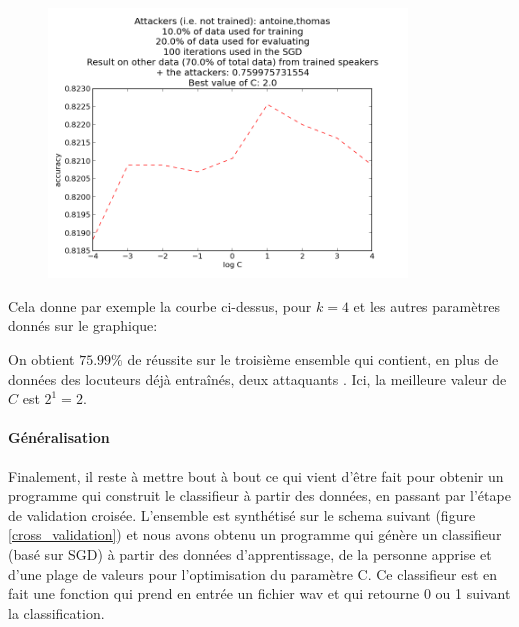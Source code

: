 \documentclass{article}
\begin{document}
\begin{figure}[!h]
\includegraphics[width=0.85\textwidth]{../bestC}
\end{figure}
Cela donne par exemple la courbe ci-dessus, pour $k=4$ et les autres paramètres donnés sur le graphique:

On obtient $75.99 \%$ de réussite sur le troisième ensemble qui contient, en plus de données des locuteurs déjà entraînés, deux \og attaquants \fg. Ici, la meilleure valeur de $C$ est $2^1 = 2$.

\paragraph{Généralisation}

Finalement, il reste à mettre bout à bout ce qui vient d'être fait pour obtenir un programme qui construit le classifieur à partir des données, en passant par l'étape de validation croisée. L'ensemble est synthétisé sur le schema suivant (figure \ref{cross_validation}) et nous avons obtenu un programme qui génère un classifieur (basé sur SGD) à partir des données d'apprentissage, de la personne apprise et d'une plage de valeurs pour l'optimisation du paramètre C. Ce classifieur est en fait une fonction qui prend en entrée un fichier wav et qui retourne 0 ou 1 suivant la classification.
\end{document}
